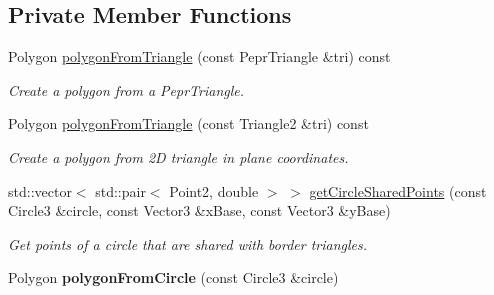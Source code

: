\subsection*{Private Member Functions}
\begin{DoxyCompactItemize}
\item 
\mbox{\label{classpepr3d_1_1_triangle_detail_a01d113a2666085931fc5d6ff28ae57df}} 
Polygon \mbox{\hyperlink{classpepr3d_1_1_triangle_detail_a01d113a2666085931fc5d6ff28ae57df}{polygon\+From\+Triangle}} (const Pepr\+Triangle \&tri) const
\begin{DoxyCompactList}\small\item\em Create a polygon from a Pepr\+Triangle. \end{DoxyCompactList}\item 
\mbox{\label{classpepr3d_1_1_triangle_detail_a9d1864037cba26a387c162d5c6eb3a66}} 
Polygon \mbox{\hyperlink{classpepr3d_1_1_triangle_detail_a9d1864037cba26a387c162d5c6eb3a66}{polygon\+From\+Triangle}} (const Triangle2 \&tri) const
\begin{DoxyCompactList}\small\item\em Create a polygon from 2D triangle in plane coordinates. \end{DoxyCompactList}\item 
\mbox{\label{classpepr3d_1_1_triangle_detail_a9bac9b98002a9f45f43f35e3cb912d9d}} 
std\+::vector$<$ std\+::pair$<$ Point2, double $>$ $>$ \mbox{\hyperlink{classpepr3d_1_1_triangle_detail_a9bac9b98002a9f45f43f35e3cb912d9d}{get\+Circle\+Shared\+Points}} (const Circle3 \&circle, const Vector3 \&x\+Base, const Vector3 \&y\+Base)
\begin{DoxyCompactList}\small\item\em Get points of a circle that are shared with border triangles. \end{DoxyCompactList}\item 
\mbox{\label{classpepr3d_1_1_triangle_detail_a71e840d63e0acc00cb7316e07ab9942c}} 
Polygon {\bfseries polygon\+From\+Circle} (const Circle3 \&circle)
\item 
\mbox{\label{classpepr3d_1_1_triangle_detail_a5a7bf09704143a299bb2d6261d540729}} 

\end{DoxyCompactItemize}
